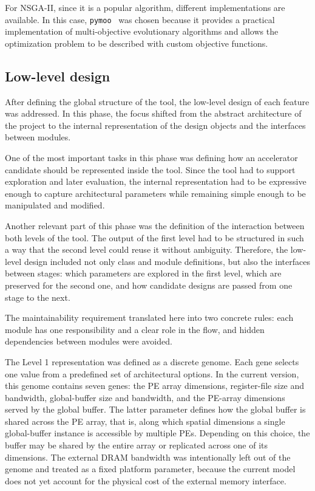 For NSGA-II, since it is a popular algorithm, different
implementations are available. In this case, \texttt{pymoo}~\cite{pymoo}
was chosen because it provides a practical implementation of
multi-objective evolutionary algorithms and allows the optimization
problem to be described with custom objective functions.

\subsection{Low-level design}
After defining the global structure of the tool, the low-level design
of each feature was addressed. In this phase, the focus shifted from
the abstract architecture of the project to the internal
representation of the design objects and the interfaces between
modules.

One of the most important tasks in this phase was defining how an
accelerator candidate should be represented inside the tool. Since
the tool had to support exploration and later evaluation, the
internal representation had to be expressive enough to capture
architectural parameters while remaining simple enough to be
manipulated and modified.

Another relevant part of this phase was the definition of the
interaction between both levels of the tool. The output of the first
level had to be structured in such a way that the second level could
reuse it without ambiguity. Therefore, the low-level design included
not only class and module definitions, but also the interfaces
between stages: which parameters are explored in the first level,
which are preserved for the second one, and how candidate designs are
passed from one stage to the next.

The maintainability requirement translated here into two concrete
rules: each module has one responsibility and a clear role in the
flow, and hidden dependencies between modules were avoided.

The Level 1 representation was defined as a discrete genome. Each
gene selects one value from a predefined set of architectural
options. In the current version, this genome contains seven genes: the
PE array dimensions, register-file size and bandwidth, global-buffer
size and bandwidth, and the PE-array dimensions served by the global
buffer. The latter parameter defines how the global buffer is shared
across the PE array, that is, along which spatial dimensions a single
global-buffer instance is accessible by multiple PEs. Depending on
this choice, the buffer may be shared by the entire array or replicated
across one of its dimensions. The external DRAM bandwidth was
intentionally left out of the genome and treated as a fixed platform
parameter, because the current model does not yet account for the
physical cost of the external memory interface.

